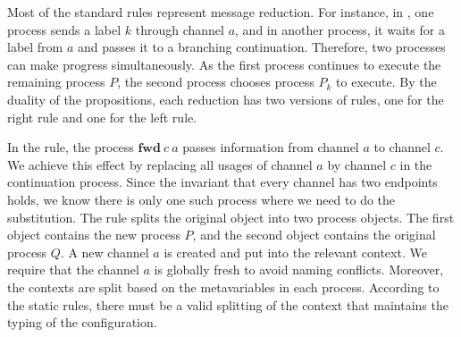 \documentclass[12pt, openany]{memoir}
\newcommand*{\fwd}[2]{\textbf{fwd}\ #1\ #2}
\begin{document}
Most of the standard rules represent message reduction. 
For instance, in , one process sends a label $k$ through channel $a$, and in another process, 
it waits for a label from $a$ and passes it to a branching continuation. Therefore, two processes can make progress simultaneously. 
As the first process continues to execute the remaining process $P$, the second process chooses process $P_k$ to execute. 
By the duality of the propositions, each reduction has two versions of rules, one for the right rule and one for the left rule.

In the  rule, the process $\fwd{c}{a}$ passes information from channel $a$ to channel $c$. 
We achieve this effect by replacing all usages of channel $a$ by channel $c$ in the continuation process. 
Since the invariant that every channel has two endpoints holds, we know there is only one such process where we need to do the substitution. 
The  rule splits the original object into two process objects. The first object contains the new process $P$, 
and the second object contains the original process $Q$. A new channel $a$ is created and put into the relevant context. 
We require that the channel $a$ is globally fresh to avoid naming conflicts. Moreover, the contexts are split based on the metavariables in each process. 
According to the static rules, there must be a valid splitting of the context that maintains the typing of the configuration. 
\end{document}

